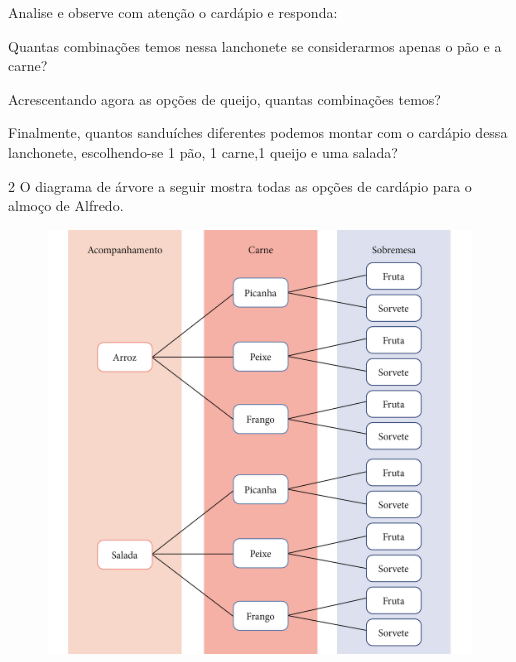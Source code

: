Analise e observe com atenção o cardápio e responda:

\begin{escolha}
\item
  Quantas combinações temos nessa lanchonete se considerarmos apenas o
  pão e a carne?


\item
  Acrescentando agora as opções de queijo, quantas combinações temos?


\item
  Finalmente, quantos sanduíches diferentes podemos montar com o
  cardápio dessa lanchonete, escolhendo-se 1 pão, 1 carne,1 queijo e uma
  salada?

\end{escolha}


\num{2} O diagrama de árvore a seguir mostra todas as opções de cardápio
para o almoço de Alfredo.

\begin{figure}[htpb!]
\includegraphics[width=\textwidth]{../ilustracoes/MAT5/SAEB_5ANO_MAT_figura82.png}
\end{figure}

